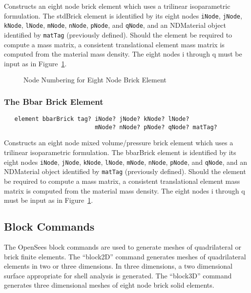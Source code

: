 \documentclass[12pt]{article}
\begin{document}
\noindent Constructs an eight node brick element which uses a trilinear
isoparametric formulation. 
The stdBrick element is identified by its eight nodes
{\tt iNode}, {\tt jNode}, {\tt kNode}, {\tt lNode},
{\tt mNode}, {\tt nNode}, {\tt pNode}, and {\tt qNode},
and an NDMaterial object identified by {\tt matTag} (previously
defined). 
Should the element be required to compute a mass matrix, a consistent 
translational element mass matrix is computed from the material mass
density. The eight nodes i through q must be input as in
Figure~\ref{bricknodenumbering}.

\begin{figure}[htpb]
\begin{center}
\end{center}
\caption{Node Numbering for Eight Node Brick Element}
\label{bricknodenumbering}
\end{figure}


\subsubsection{The Bbar Brick Element}
{\sf\small
\begin{verbatim}
   element bbarBrick tag? iNode? jNode? kNode? lNode? 
                          mNode? nNode? pNode? qNode? matTag? 
\end{verbatim}
}

\noindent Constructs an eight node 
mixed volume/pressure brick element which uses a trilinear
isoparametric formulation. 
The bbarBrick element is identified by its eight nodes
{\tt iNode}, {\tt jNode}, {\tt kNode}, {\tt lNode},
{\tt mNode}, {\tt nNode}, {\tt pNode}, and {\tt qNode},
and an NDMaterial object identified by {\tt matTag} (previously
defined). 
Should the element be required to compute a mass matrix, a consistent 
translational element mass matrix is computed from the material
mass density.
The eight nodes i through q must be input as in
Figure~\ref{bricknodenumbering}.


\subsection{Block Commands}

The OpenSees block commands are used to generate meshes of quadrilateral or
brick finite elements.  The ``block2D'' command generates meshes of quadrilateral
elements in two or three dimensions.  In three dimensions, a two dimensional surface
appropriate for shell analysis is generated.  The ``block3D'' command generates 
three dimensional meshes of eight node brick solid elements.
\end{document}
